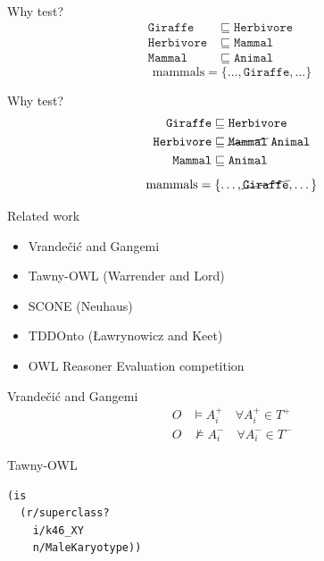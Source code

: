 \documentclass[17pt,mathserif]{beamer}
\newcommand{\oclass}[1]{\ensuremath{\mathtt{#1}}}
\newcommand{\osub}{\sqsubseteq}
\begin{document}
\begin{frame}{Why test?}
  \begin{align*}
    \oclass{Giraffe} &\osub \oclass{Herbivore} \\
    \oclass{Herbivore} &\osub \oclass{Mammal} \phantom{\; \oclass{Animal}} \\
    \oclass{Mammal} &\osub \oclass{Animal}
  \end{align*}
  \[ \mathrm{mammals} = \{\dots, \oclass{Giraffe} ,\dots\} \]
\end{frame}

\begin{frame}{Why test?}
  \begin{align*}
    \oclass{Giraffe} &\osub \oclass{Herbivore} \\
    \oclass{Herbivore} &\osub \cancel{\oclass{Mammal}} \; \oclass{Animal} \\
    \oclass{Mammal} &\osub \oclass{Animal}
  \end{align*}
  \[ \mathrm{mammals} = \{\dots, \cancel{\oclass{Giraffe}} ,\dots\} \]
\end{frame}

\begin{frame}{Related work}
  \begin{itemize}
    \item Vrande\v{c}i\'c and Gangemi
    \item Tawny-OWL (Warrender and Lord)
    \item SCONE (Neuhaus)
    \item TDDOnto ({\L}awrynowicz and Keet)
    \item OWL Reasoner Evaluation competition
  \end{itemize}
\end{frame}

\begin{frame}{Vrande\v{c}i\'c and Gangemi}
  \begin{align*}
    O &\models A_i^{+} \quad \forall A_i^{+} \in T^{+} \\
    O &\not\models A_i^{-} \quad \forall A_i^{-} \in T^{-}
  \end{align*}
\end{frame}

\begin{frame}[fragile]{Tawny-OWL}
  \begin{lstlisting}[language=Lisp,basicstyle=\normalsize\ttfamily]
(is
  (r/superclass?
    i/k46_XY
    n/MaleKaryotype))
  \end{lstlisting}
\end{frame}
\end{document}
